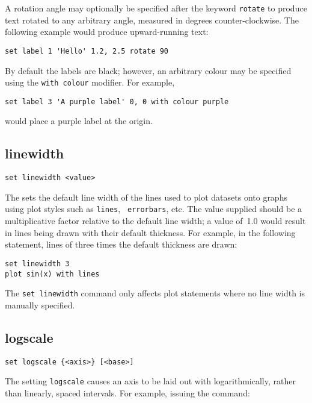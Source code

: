 A rotation angle may optionally be specified after the keyword {\tt rotate}
to produce text rotated to any arbitrary angle, measured in degrees
counter-clockwise. The following example would produce upward-running text:

\begin{verbatim}
set label 1 'Hello' 1.2, 2.5 rotate 90
\end{verbatim}

By default the labels are black; however, an arbitrary colour may be specified
using the {\tt with colour} modifier.  For example,

\begin{verbatim}
set label 3 'A purple label' 0, 0 with colour purple
\end{verbatim}

\noindent would place a purple label at the origin.


\subsection{linewidth}

\begin{verbatim}
set linewidth <value>
\end{verbatim}

The  sets the default line width of the lines used to
plot datasets onto graphs using plot styles such as {\tt lines}, {\tt
errorbars}, etc. The value supplied should be a multiplicative factor relative
to the default line width; a value of~1.0 would result in lines being drawn
with their default thickness. For example, in the following statement, lines of
three times the default thickness are drawn:

\begin{verbatim}
set linewidth 3
plot sin(x) with lines
\end{verbatim}

\noindent The {\tt set linewidth} command only affects plot statements where no
line width is manually specified.


\subsection{logscale}

\begin{verbatim}
set logscale {<axis>} [<base>]
\end{verbatim}

The setting {\tt logscale} causes an axis to be laid out with logarithmically,
rather than linearly, spaced intervals.  For example, issuing the command:

